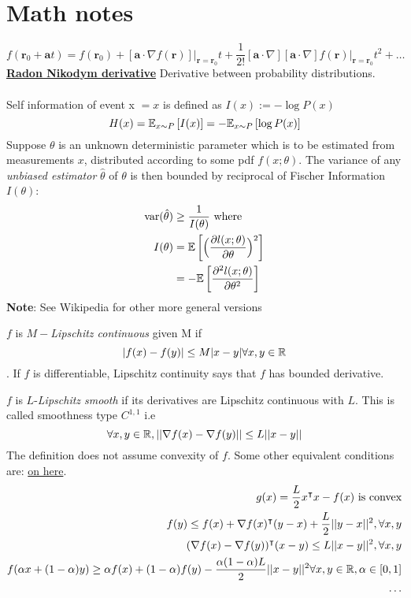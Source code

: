 \documentclass[summaries.tex]{subfiles}
\begin{document}
\section{Math notes}
\begin{equation}
  f(\boldsymbol{r}_0+\boldsymbol{a}t) = f(\boldsymbol{r}_0) +  [\boldsymbol{a}
    \cdot \nabla f(\boldsymbol{r})] \Big|_{\boldsymbol{r}=\boldsymbol{r}_0}t 
      + \frac{1}{2!} [\boldsymbol{a} \cdot \nabla][\boldsymbol{a} \cdot
        \nabla]f(\boldsymbol{r}) \Big|_{\boldsymbol{r}=
          \boldsymbol{r}_0} t^2 + \ldots
\end{equation}
\href{https://en.wikipedia.org/wiki/Radon%E2%80%93Nikodym_theorem}
{{\bf Radon Nikodym derivative}} Derivative between probability distributions.\\
 \\
Self information of event x $= x$ is defined as $I(x) := -\log P(x)$
$$
H(x) = \mathbb{E}_{x \sim P}\left[I(x)\right] = -\mathbb{E}_{x \sim P}\left[\log P(x)\right]
$$
 \cite{math-stat16} 
Suppose $\theta$ is an unknown deterministic parameter which is to be estimated from
measurements $x$, distributed according to some pdf $f(x; \theta)$. The variance of any 
\textit{unbiased estimator} $\hat{\theta}$ of $\theta$ is then bounded by reciprocal of
Fischer Information $I(\theta)$:
\begin{align}
  \text{var}(\hat{\theta}) &\geq \frac{1}{I(\theta)} \text{ where }\nonumber\\
  I(\theta) &= \mathbb{E}\left[\Big(\frac{\partial l(x; \theta)}{\partial \theta}\Big)^2\right] \nonumber\\
       &= -\mathbb{E}\left[\frac{\partial^2 l(x; \theta)}{\partial \theta^2}\right] \nonumber
\end{align}
{\bf Note}: See Wikipedia for other more general versions

$f$ is $M-$\emph{Lipschitz continuous} given M if 
$$|f(x) - f(y)| \leq M|x-y| \forall x,y \in \mathbb{R}$$. 
If $f$ is differentiable, Lipschitz continuity
says that $f$ has bounded derivative. 

$f$ is $L$-\emph{Lipschitz smooth} if its derivatives are Lipschitz continuous
with $L$. This is called smoothness type $C^{1,1}$ i.e 
$$\forall x, y \in \mathbb{R}, ||\nabla f(x) - \nabla f(y)|| \leq L||x-y||$$
The definition does not assume convexity of $f$. Some other equivalent conditions
are: \href{https://xingyuzhou.org/blog/notes/Lipschitz-gradient}{on here}.
\begin{align}
  g(x) = \frac{L}{2}x^\intercal x - f(x) \text{ is convex} \\
  f(y) \leq f(x) + \nabla f(x)^\intercal (y-x) + \frac{L}{2}||y-x||^2, \forall x,y 
    \label{eqn:quad_upper}\\
  (\nabla f(x) - \nabla f(y))^\intercal (x-y) \leq L||x-y||^2, \forall x,y \\
  f(\alpha x + (1 - \alpha)y) \geq \alpha f(x) + (1 - \alpha)f(y) - 
                                \frac{\alpha(1 - \alpha)L}{2}||x-y||^2 
                                \forall x,y \in \mathbb{R}, \alpha \in [0, 1]\\
  \cdots
\end{align}
\end{document}
